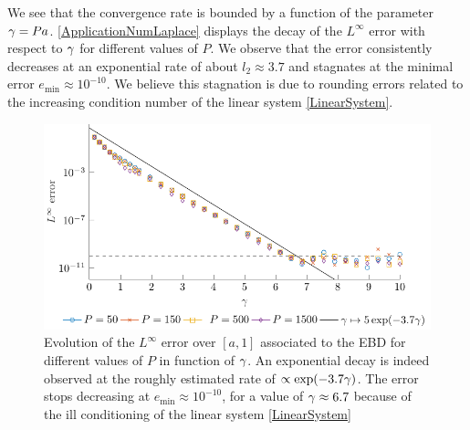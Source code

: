 \documentclass[main]{subfiles}
\begin{document}
\begin{remark}
	We see that the convergence rate is bounded by a function of the parameter $\gamma = Pa$. \autoref{ApplicationNumLaplace} displays the decay of the $L^\infty$ error with respect to $\gamma$ for different values of $P$. We observe that the error consistently decreases at an exponential rate of about $l_2 \approx 3.7$ and stagnates at the minimal error $e_{\min} \approx 10^{-10}$. We believe this stagnation is due to rounding errors related to the increasing condition number of the linear system \eqref{LinearSystem}.  
\end{remark}
\begin{figure}[t]
	\centering
	\includegraphics[scale = 0.7]{EBD/figs/ApplicationNumLaplace}			
	\caption{Evolution of the $L^{\infty}$ error over $[a,1]$ associated to the EBD for different values of $P$ in function of $\gamma$. An exponential decay is indeed observed at the roughly estimated rate of $\propto \exp(-3.7\gamma)$. The error stops decreasing at $e_{\min} \approx 10^{-10}$, for a value of $\gamma \approx 6.7$ because of the ill conditioning of the linear system \eqref{LinearSystem}}
	\label{ApplicationNumLaplace}
\end{figure}
\end{document}
